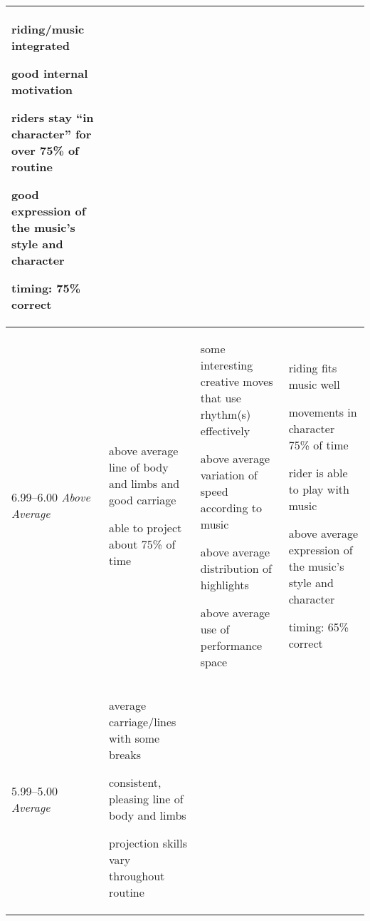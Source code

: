 \begin{longtable}{|p{1.5cm}|p{5.5cm}|p{5.5cm}|p{5.5cm}|}
\begin{judging_items}%
\item riding/music integrated
\item good internal motivation
\item riders stay ``in character'' for over 75\% of routine
\item good expression of the music's style and character
\item timing: 75\% correct 
\end{judging_items} \\
\hline

6.99--6.00 \newline
\emph{Above Average} &

\begin{judging_items}%
\item above average line of body and limbs and good carriage
\item able to project about 75\% of time
\end{judging_items} &

\begin{judging_items}%
\item some interesting creative moves that use rhythm(s) effectively
\item above average variation of speed according to music
\item above average distribution of highlights
\item above average use of performance space
\end{judging_items} &

\begin{judging_items}%
\item riding fits music well
\item movements in character 75\% of time
\item rider is able to play with music
\item above average expression of the music's style and character
\item timing: 65\% correct
\end{judging_items} \\
\hline

5.99--5.00 \newline
\emph{Average} &

\begin{judging_items}%
\item average carriage/lines with some breaks
\item consistent, pleasing line of body and limbs
\item projection skills vary throughout routine
\end{judging_items} &


\end{longtable}
